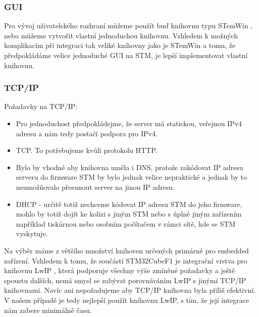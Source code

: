 \subsubsection{GUI}
Pro vývoj uživatelského rozhraní můžeme použít buď knihovnu typu STemWin \cite{STemWin}, nebo můžeme
vytvořit vlastní jednoduchou knihovnu.
Vzhledem k možných komplikacím při integraci tak veliké knihovny jako je STemWin a tomu, že
předpokládáme velice jednoduché GUI na STM, je lepší implementovat vlastní knihovnu.

\subsubsection{TCP/IP}
Požadavky na TCP/IP:
\begin{itemize}
  \item Pro jednoduchost předpokládejme, že server má statickou, veřejnou IPv4 adresu a nám tedy
    postačí podpora pro IPv4.
  \item TCP. To potřebujeme kvůli protokolu HTTP.
  \item Bylo by vhodné aby knihovna uměla i DNS, protože zakódovat IP adresu serveru do firmware
    STM by bylo jednak velice nepraktické a jednak by to neumožňovalo přesunout server na jinou
    IP adresu.
  \item DHCP - určitě totiž nechceme kódovat IP adresu STM do jeho firmware, mohlo by totiž dojít
    ke kolizi s jiným STM nebo s úplně jiným zařízením například tiskárnou nebo osobním počítačem
    v rámci sítě, kde se STM vyskytuje.
\end{itemize}
Na výběr máme z většího množství knihoven určených primárně pro embedded zařízení.
Vzhledem k tomu, že součástí STM32CubeF1 je integrační vrstva pro knihovnu LwIP \cite{LwIP}, která podporuje
všechny výše zmíněné požadavky a ještě spoustu dalších, nemá smysl se zabývat porovnáváním LwIP
s jinými TCP/IP knihovnami.
Navíc ani nepožadujeme aby TCP/IP knihovna byla příliš efektivní.
V našem případě je tedy nejlepší použít knihovnu LwIP, s tím, že její integrace nám zabere minimálně
času.

